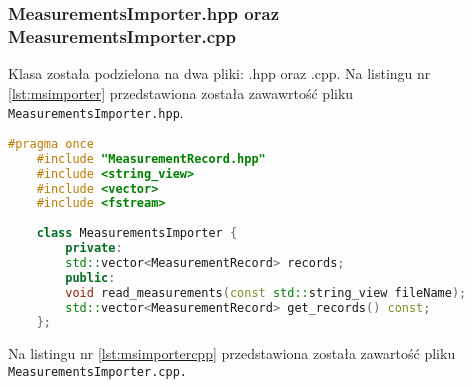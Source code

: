 \subsubsection{MeasurementsImporter.hpp oraz MeasurementsImporter.cpp}

Klasa została podzielona na dwa pliki: .hpp oraz .cpp. Na listingu nr \ref{lst:msimporter} przedstawiona została zawawrtość pliku \texttt{MeasurementsImporter.hpp}.

\begin{lstlisting}[caption=Zawartość pliku \texttt{MeasurementsImporter.hpp}, label={lst:msimporter}, language=C++]
	#pragma once
	#include "MeasurementRecord.hpp"
	#include <string_view>
	#include <vector>
	#include <fstream>
	
	class MeasurementsImporter {
		private:
		std::vector<MeasurementRecord> records;
		public:
		void read_measurements(const std::string_view fileName); 
		std::vector<MeasurementRecord> get_records() const;
	};
\end{lstlisting}

Na listingu nr \ref{lst:msimportercpp} przedstawiona została zawartość pliku \texttt{MeasurementsImporter.cpp.}

